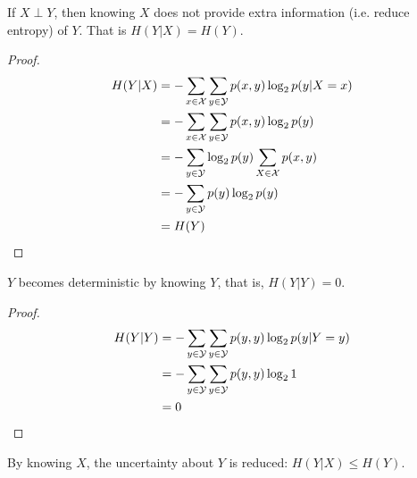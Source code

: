 \documentclass{article}
\begin{document}
	\begin{proposition}
		If $X \perp Y$, then knowing $X$ does not provide extra information (i.e. reduce entropy) of $Y$. That is $H(Y|X) = H(Y)$.
	\end{proposition}
	
	\begin{proof}
		\begin{align}
			H(Y|X) &= - \sum_{x \in \mathcal{{X}}} \sum_{y \in \mathcal{{Y}}} p(x, y) \log_2 p(y | X = x) \\
			&= - \sum_{x \in \mathcal{{X}}} \sum_{y \in \mathcal{{Y}}} p(x, y) \log_2 p(y) \\
			&= - \sum_{y \in \mathcal{{Y}}} \log_2 p(y) \sum_{X \in \mathcal{{X}}} p(x, y) \\
			&= - \sum_{y \in \mathcal{{Y}}} p(y) \log_2 p(y) \\
			&= H(Y)
		\end{align}
	\end{proof}
	
	\begin{proposition}
		$Y$ becomes deterministic by knowing $Y$, that is, $H(Y|Y) = 0$.
	\end{proposition}
	
	\begin{proof}
		\begin{align}
			H(Y|Y) &= - \sum_{y \in \mathcal{{Y}}} \sum_{y \in \mathcal{{Y}}} p(y, y) \log_2 p(y | Y = y) \\
			&= - \sum_{y \in \mathcal{{Y}}} \sum_{y \in \mathcal{{Y}}} p(y, y) \log_2 1 \\
			&= 0
		\end{align}
	\end{proof}
	
	\begin{proposition}
		By knowing $X$, the uncertainty about $Y$ is reduced: $H(Y|X) \leq H(Y)$.
	\end{proposition}
	
\end{document}
